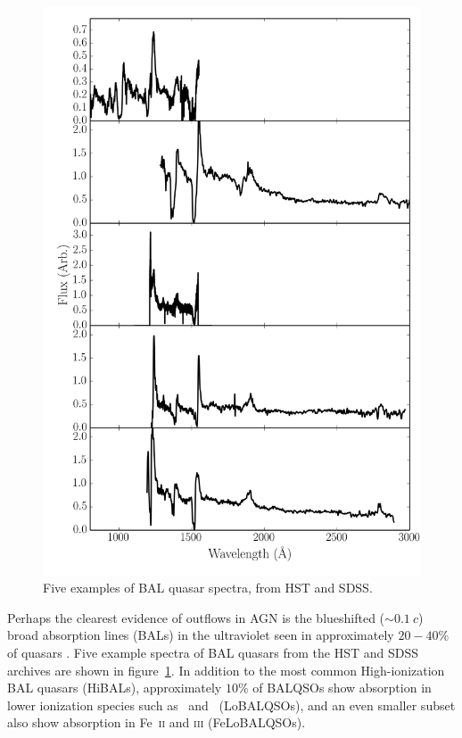 \begin{figure}
\centering
\includegraphics[width=1.0\textwidth]{figures/02-outflows/bal_spectra.png}
\caption
{
Five examples of BAL quasar spectra, from HST and SDSS.
} 
\label{fig:bals}
\end{figure}

Perhaps the clearest evidence of outflows in AGN is  
the blueshifted ($\sim 0.1~c$) broad absorption lines (BALs) in the 
ultraviolet seen in approximately $20-40\%$ of quasars
\citep{weymann1991, knigge2008, dai2008, allen2011}. Five example
spectra of BAL quasars from the HST and SDSS archives are shown in 
figure~\ref{fig:bals}. In addition to the most common High-ionization
BAL quasars (HiBALs), approximately $10\%$ of BALQSOs show absorption
in lower ionization species such as \mgii\ and \aliii\ (LoBALQSOs),
and an even smaller subset also show absorption in Fe~\textsc{ii} and 
\textsc{iii} (FeLoBALQSOs). 

